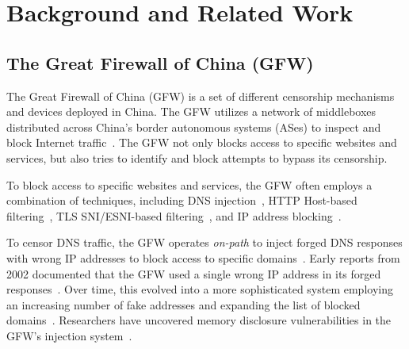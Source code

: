 \documentclass[conference,compsoc]{IEEEtran}
\begin{document}

%
%
%
%
%
%
%

\section{Background and Related Work}

\subsection{The Great Firewall of China (GFW)}
The Great Firewall of China (GFW) is a set of
different censorship mechanisms and devices deployed in China.
The GFW utilizes a network of middleboxes distributed across China's border autonomous systems (ASes)
to inspect and block Internet traffic~\cite{Xu2011a}.
The GFW not only blocks access to specific websites and services,
but also tries to identify and block attempts to bypass its censorship.

To block access to specific websites and services,
the GFW often employs a combination of techniques,
including DNS injection~\cite{Duan2012a, Hoang2021a},
HTTP Host-based filtering~\cite{Rambert2021a},
TLS SNI/ESNI-based filtering~\cite{Chai2019a, 2022-tls-blocking, Hoang2024a, Bock2020ESNI},
and IP address blocking~\cite[\S4]{Chai2019a}.

To censor DNS traffic,
the GFW operates \textit{on-path} to inject forged DNS responses with wrong IP addresses
to block access to specific domains~\cite{Farnan2016a,Anonymous2014a,Hoang2021a,Anonymous2020a,Fan2025a}.
Early reports from 2002 documented that the GFW used a single wrong IP address in its forged responses~\cite{Dong2002a,Zittrain2003a}.
Over time, this evolved into a more sophisticated system employing an increasing number of fake
addresses and expanding the list of blocked domains~\cite{Lowe2007a, Anonymous2014a, Anonymous2020a, Hoang2021a}.
Researchers have uncovered memory disclosure vulnerabilities in the GFW's injection system~\cite{gfw-looking-glass-post,Sakamoto2024a,Fan2025a}.
\end{document}
